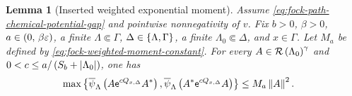 \documentclass[11pt,a4paper]{article}
\theoremstyle{plain}
\newtheorem{lem}[thm]{Lemma}
\theoremstyle{definition}
\theoremstyle{remark}
\begin{document}
\begin{lem}[Inserted weighted exponential moment]
Assume \eqref{eq:fock-path-chemical-potential-gap} and pointwise nonnegativity of $v$.
Fix $b>0$, $\beta>0$, $a\in\left( 0,\,\beta\varepsilon \right)$, a finite $\Lambda\Subset\Gamma$,
$\Delta\in\left\{ \Lambda,\Gamma \right\}$, a finite $\Lambda_0\Subset\Delta$, and $x\in\Gamma$.
Let $M_a$ be defined by \eqref{eq:fock-weighted-moment-constant}.
For every $A\in\mathcal{R} \left( \Lambda_0 \right)^{\gamma}$ and
$0<c\leq a/\left( S_b+\left| \Lambda_0 \right| \right)$, one has
\begin{equation}
\begin{aligned}
\max\setone{
\fun{\oastate[\overline{\psi}_{\Lambda}]}{
A\napiernum^{cQ_{x,\Delta}}\faadj{A}},
\fun{\oastate[\overline{\psi}_{\Lambda}]}{
\faadj{A}\napiernum^{cQ_{x,\Delta}}A}}
& \leq
M_a\norm{A}^{2}.
\end{aligned}
\label{eq:fock-inserted-exponential-moment-bound}
\end{equation}
\end{lem}
\end{document}
